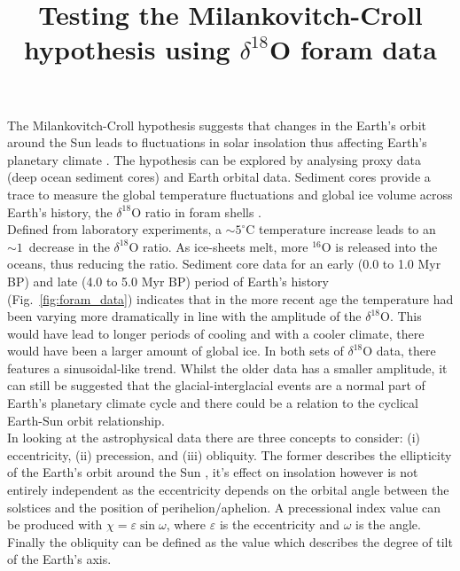 \documentclass[12pt, onecolumn]{revtex4}    %
\begin{document}
                     

\title{Testing the Milankovitch-Croll hypothesis using $\delta^{18}$O foram data} 
\maketitle

\vspace{-4ex}

The Milankovitch-Croll hypothesis suggests that changes in the Earth's orbit around the Sun leads to fluctuations in solar insolation thus affecting Earth's planetary climate \cite{ruddiman_climate}. The hypothesis can be explored by analysing proxy data (deep ocean sediment cores) and Earth orbital data. Sediment cores provide a trace to measure the global temperature fluctuations and global ice volume across Earth's history, the $\delta^{18}$O ratio in foram shells \cite{droxler_climate}. \\


Defined from laboratory experiments, a $\sim 5^{\circ}\mathrm{C}$ temperature increase leads to an $\sim 1$\textperthousand\ decrease in the $\delta^{18}$O ratio. As ice-sheets melt, more $^{16}$O is released into the oceans, thus reducing the ratio. Sediment core data for an early (0.0 to 1.0 Myr BP) and late (4.0 to 5.0 Myr BP) period of Earth's history (Fig.~\ref{fig:foram_data}) indicates that in the more recent age the temperature had been varying more dramatically in line with the amplitude of the $\delta^{18}$O. This would have lead to longer periods of cooling and with a cooler climate, there would have been a larger amount of global ice. In both sets of $\delta^{18}$O data, there features a sinusoidal-like trend. Whilst the older data has a smaller amplitude, it can still be suggested that the glacial-interglacial events are a normal part of Earth's planetary climate cycle and there could be a relation to the cyclical Earth-Sun orbit relationship. \\

In looking at the astrophysical data there are three concepts to consider: (i) eccentricity, (ii) precession, and (iii) obliquity. The former describes the ellipticity of the Earth's orbit around the Sun \cite{carroll_astro}, it's effect on insolation however is not entirely independent as the eccentricity depends on the orbital angle between the solstices and the position of perihelion/aphelion. A precessional index value can be produced with $\chi= \varepsilon \sin{\omega}$, where $\varepsilon$ is the eccentricity and $\omega$ is the angle. Finally the obliquity can be defined as the value which describes the degree of tilt of the Earth's axis.  \\
\end{document}
